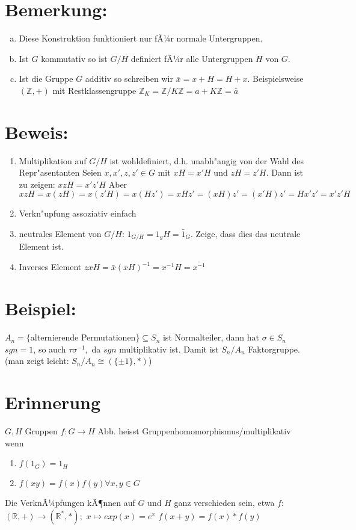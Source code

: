 \documentclass[12pt,a4paper,ngerman]{scrreprt}
\begin{document}
\section{Bemerkung:}
\begin{enumerate}[(a)]
\item Diese Konstruktion funktioniert nur fÃ¼r normale Untergruppen.
\item Ist $G$ kommutativ so ist $G/H$ definiert fÃ¼r alle Untergruppen $H$ von $G$.
\item Ist die Gruppe $G$ additiv so schreiben wir $\bar{x} = x+H = H+x$. 
Beispielsweise $(\mathbb{Z}, +)$ mit Restklassengruppe $\mathbb{Z}_K = \mathbb{Z} / K \mathbb{Z} = a+K\mathbb{Z} = \bar{a}$
\end{enumerate}

\section{Beweis:}
\begin{enumerate}[(1)]
\item Multiplikation auf $G/H$ ist wohldefiniert, d.h. unabh"angig von der Wahl des Repr"asentanten
Seien $x,x',z,z' \in G$ mit $xH=x'H$ und $zH=z'H$. Dann ist zu zeigen: $xzH = x'z'H$ Aber $xzH = x(zH) = x(z'H) = x(Hz') = xHz' = (xH)z' = (x'H)z' = Hx'z' = x'z'H$
\item Verkn"upfung assoziativ einfach
\item neutrales Element von $G/H$: $1_{G/H}= 1_gH =\bar{1}_G$. Zeige, dass dies das neutrale Element ist.
\item Inverses Element $zxH=\bar{x} (xH)^{-1} = x^{-1}H=\bar{x^{-1}}$ %
\end{enumerate}

\section{Beispiel:}
$A_n = \{$alternierende Permutationen$\} \subseteq S_n$ ist Normalteiler, dann hat $\sigma \in S_n$ $sgn=1$, so auch $\tau \sigma^{-1},$ da $sgn$ multiplikativ ist.
Damit ist $S_n/A_n$ Faktorgruppe.  (man zeigt leicht: $S_n/A_n \cong (\{\pm 1\},*)$)

\section{Erinnerung}
$G,H$ Gruppen $f: G\to H$ Abb. heisst Gruppenhomomorphismus/multiplikativ wenn
\begin{enumerate}[({GH}1)]
\item $f(1_G) = 1_H$
\item $f(xy) = f(x)f(y) \forall x,y \in G$
\end{enumerate}
Die VerknÃ¼pfungen kÃ¶nnen auf $G$ und $H$ ganz verschieden sein, etwa 
$f:$ \mbox{$(\mathbb{R},+) \to (\mathbb{R}^*,*);$} \mbox{$x \mapsto exp(x) = e^x$} $f(x+y) = f(x) * f(y)$
\end{document}
